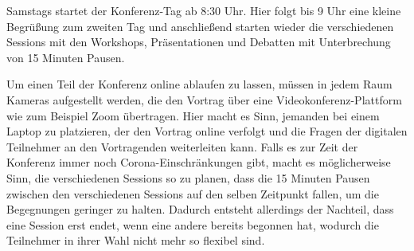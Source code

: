 Samstags startet der Konferenz-Tag ab 8:30 Uhr. Hier folgt bis 9 Uhr eine kleine Begrüßung zum zweiten Tag und anschließend starten wieder die verschiedenen Sessions mit den Workshops, Präsentationen und Debatten mit Unterbrechung von 15 Minuten Pausen. 

Um einen Teil der Konferenz online ablaufen zu lassen, müssen in jedem Raum Kameras aufgestellt werden, die den Vortrag über eine Videokonferenz-Plattform wie zum Beispiel Zoom übertragen. Hier macht es Sinn, jemanden bei einem Laptop zu platzieren, der den Vortrag online verfolgt und die Fragen der digitalen Teilnehmer an den Vortragenden weiterleiten kann. 
Falls es zur Zeit der Konferenz immer noch Corona-Einschränkungen gibt, macht es möglicherweise Sinn, die verschiedenen Sessions so zu planen, dass die 15 Minuten Pausen zwischen den verschiedenen Sessions auf den selben Zeitpunkt fallen, um die Begegnungen geringer zu halten. Dadurch entsteht allerdings der Nachteil, dass eine Session erst endet, wenn eine andere bereits begonnen hat, wodurch die Teilnehmer in ihrer Wahl nicht mehr so flexibel sind.

